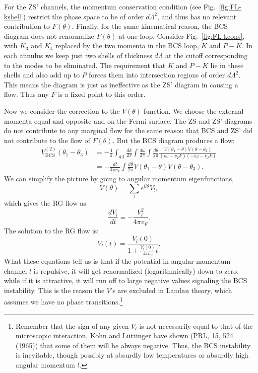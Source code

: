 For the ZS' channels, the momentum conservation condition (see Fig.~\ref{fig:FL-kshell}) restrict the phase space to be of order $d\Lambda^2$, and thus has no relevant contribution to $F(\theta)$.
Finally, for the same kinematical reason, the BCS diagram does not renormalize $F(\theta)$ at one loop.
Consider Fig.~\ref{fig:FL-kcons}, with $K_3$ and $K_4$ replaced by the two momenta in the BCS loop, $K$ and $P-K$.
In each annulus we keep just two shells of thickness $d\Lambda$ at the cutoff corresponding to the modes to be eliminated. 
The requirement that $K$ and $P-K$ lie in these shells and also add up to $P$ forces them into intersection regions of order $d\Lambda^2$. 
This means the diagram is just as ineffective as the ZS' diagram in causing a flow. 
Thus any $F$ is a fixed point to this order.

Now we consider the correction to the $V(\theta)$ function.
We choose the external momenta equal and opposite and on the Fermi surface. 
The ZS and ZS' diagrams do not contribute to any marginal flow for the same reason that BCS and ZS' did not contribute to the flow of $F(\theta)$.
But the BCS diagram produces a flow:
\begin{equation}
\begin{aligned}
	V^{(2)}_{\mathrm{BCS}}(\theta_1-\theta_3) 
	&= -\frac{1}{2}\int_{d\Lambda}\frac{dk}{2\pi}\int\frac{d\omega}{2\pi}\int\frac{d\theta}{2\pi} 
		\frac{V(\theta_1-\theta)V(\theta-\theta_3)}{(i\omega-v_F k)(-i\omega-v_F k)} \\
	&= -\frac{dt}{4\pi v_F}\int \frac{d\theta}{2\pi}V(\theta_1-\theta)V(\theta-\theta_3).
\end{aligned}
\end{equation} 
We can simplify the picture by going to angular momentum eigenfunctions,
\begin{equation}
	V(\theta) = \sum_l e^{il\theta} V_l,
\end{equation}
which gives the RG flow as
\begin{equation}
	\frac{dV_l}{dt} = -\frac{V_l^2}{4\pi v_F}.
\end{equation}
The solution to the RG flow is:
\begin{equation}
	V_l(t) = \frac{V_l(0)}{1+\frac{V_l(0)}{4\pi v_F}t}.
\end{equation}
What these equations tell us is that if the potential in angular momentum channel $l$ is repulsive, it will get renormalized (logarithmically) down to zero, while if it is attractive, it will run off to large negative values signaling the BCS instability. 
This is the reason the $V$’s are excluded in Landau theory, which assumes we have no phase transitions.\footnote{Remember that the sign of any given $V_l$ is not necessarily equal to that of the microscopic interaction. Kohn and Luttinger have shown (PRL, 15, 524 (1965)) that some of them will be always negative. Thus, the BCS instability is inevitable, though possibly at absurdly low temperatures or absurdly high angular momentum $l$.}


